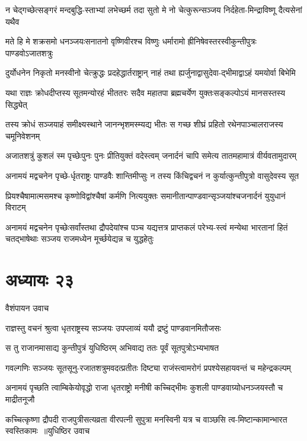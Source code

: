 \twolineshloka
{न चेद्गच्छेत्सङ्गरं मन्दबुद्धि-स्ताभ्यां लभेच्छर्म तदा सुतो मे}
{नो चेत्कुरून्सञ्जय निर्दहेता-मिन्द्राविष्णू दैत्यसेनां यथैव}


\twolineshloka
{मते हि मे शक्रसमो धनञ्जयःसनातनो वृष्णिवीरश्च विष्णुः}
{धर्मारामो ह्रीनिषेवस्तरस्वीकुन्तीपुत्रः पाण्डवोऽजातशत्रुः}


\twolineshloka
{दुर्योधनेन निकृतो मनस्वीनो चेत्क्रुद्धः प्रदहेद्धार्तराष्ट्रान्}
{नाहं तथा ह्यर्जुनाद्वासुदेवा-द्भीमाद्वाऽहं यमयोर्वा बिभेमि}


\twolineshloka
{यथा राज्ञः क्रोधदीप्तस्य सूतमन्योरहं भीततरः सदैव}
{महातपा ब्रह्मचर्येण युक्तःसङ्कल्पोऽयं मानसस्तस्य सिद्ध्येत्}


\twolineshloka
{तस्य क्रोधं सञ्जयाहं समीक्ष्यस्थाने जानन्भृशमस्म्यद्य भीतः}
{स गच्छ शीघ्रं प्रहितो रथेनपाञ्चालराजस्य चमूनिवेशनम्}


\twolineshloka
{अजातशत्रुं कुशलं स्म पृच्छेःपुनः पुनः प्रीतियुक्तं वदेस्त्वम्}
{जनार्दनं चापि समेत्य तातमहामात्रं वीर्यवतामुदारम्}


\twolineshloka
{अनामयं मद्वचनेन पृच्छे-र्धृतराष्ट्रः पाण्डवैः शान्तिमीप्सुः}
{न तस्य किंचिद्वचनं न कुर्यात्कुन्तीपुत्रो वासुदेवस्य सूत}


\twolineshloka
{प्रियश्चैषामात्मसमश्च कृष्णोविद्वांश्चैषां कर्मणि नित्ययुक्तः}
{समानीतान्पाण्डवान्सृञ्जयांश्चजनार्दनं युयुधानं विराटम्}


\twolineshloka
{अनामयं मद्वचनेन पृच्छेःसर्वांस्तथा द्रौपदेयांश्च पञ्च}
{यद्यत्तत्र प्राप्तकलं परेभ्य-स्त्वं मन्येथा भारतानां हितं चतद्भाषेथाः सञ्जय राजमध्येन मूर्च्छयेद्यन्न च युद्धहेतुः}


\chapter{अध्यायः २३}
\twolineshloka
{वैशंपायन उवाच}
{}


\twolineshloka
{राज्ञस्तु वचनं श्रुत्वा धृतराष्ट्रस्य सञ्जयः}
{उपप्लाव्यं ययौ द्रष्टुं पाण्डवानमितौजसः}


\twolineshloka
{स तु राजानमासाद्य कुन्तीपुत्रं युधिष्ठिरम्}
{अभिवाद्य ततः पूर्वं सूतपुत्रोऽभ्यभाषत}


\twolineshloka
{गवल्गणिः सञ्जयः सूतसूनु-रजातशत्रुमवदत्प्रतीतः}
{दिष्ट्या राजंस्त्वामरोगं प्रपश्येसहायवन्तं च महेन्द्रकल्पम्}


\twolineshloka
{अनामयं पृच्छति त्वाम्बिकेयोवृद्धो राजा धृतराष्ट्रो मनीषी}
{कच्चिद्भीमः कुशली पाण्डवाग्र्योधनञ्जयस्तौ च माद्रीतनूजौ}


\threelineshloka
{कच्चित्कृष्णा द्रौपदी राजपुत्रीसत्यव्रता वीरपत्नी सुपुत्रा}
{मनस्विनी यत्र च वाञ्छसि त्व-मिष्टान्कामान्भारत स्वस्तिकामः ॥युधिष्ठिर उवाच}
{}


